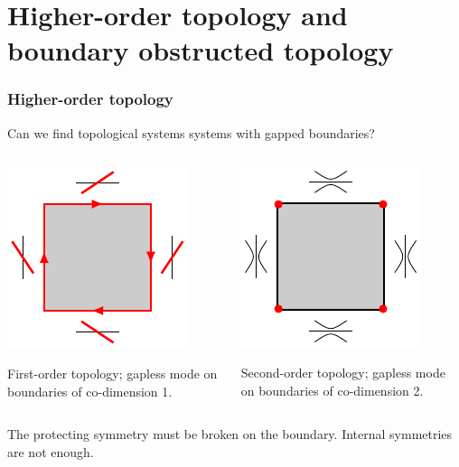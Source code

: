 \documentclass{beamer}
\renewcommand{\(}{\left(}
\renewcommand{\)}{\right)}
\renewcommand{\[}{\left[}
\renewcommand{\]}{\right]}
\begin{document}

\section{Higher-order topology and boundary obstructed topology}

\begin{frame}
    \frametitle{Higher-order topology}

    Can we find topological systems systems with gapped boundaries?
    \begin{columns}
        \begin{column}{0.5\textwidth}
            \begin{center}
                \includegraphics[valign=c]{first_order_boundary.pdf} 
            \end{center}
            First-order topology; gapless mode on boundaries of co-dimension 1. 
        \end{column}
        \begin{column}{0.5\textwidth}
            \begin{center}
                \includegraphics[valign=c]{second_order_surface.pdf}
            \end{center}
            Second-order topology; gapless mode on boundaries of co-dimension 2. 
        \end{column}
    \end{columns} 
    \begin{framed}
        The protecting symmetry must be broken on the boundary. Internal symmetries are not enough. 
    \end{framed}
\end{frame}
\end{document}
